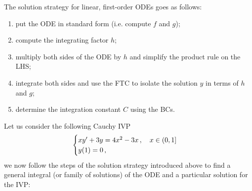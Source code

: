 \documentclass[../main.tex]{subfiles}
\begin{document}
\begin{interpretation*}{}
     The solution strategy for linear, first-order ODEs goes as follows:
     \begin{enumerate}
          \item put the ODE in standard form (i.e. compute $f$ and $g$);
          \item compute the integrating factor $h$;
          \item multiply both sides of the ODE by $h$ and simplify the product rule on the LHS;
          \item integrate both sides and use the FTC to isolate the solution $y$ in terms of $h$ and $g$;
          \item determine the integration constant $C$ using the BCs.
     \end{enumerate}
\end{interpretation*}
\begin{example}[label=ex1.2.0.0]{}{}
     Let us consider the following Cauchy IVP
     \begin{equation*}
        \begin{cases}
            x y' + 3y = 4x^{2}-3x\,, \quad x\in(0,1]\\
            y(1) = 0\,, 
        \end{cases}
     \end{equation*}
     we now follow the steps of the solution strategy introduced above to find a general integral (or family of solutions) of the ODE and a particular solution for the IVP:
\end{example}
\end{document}
